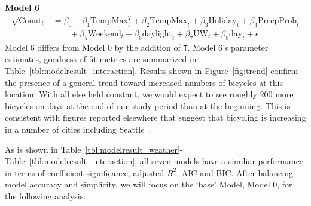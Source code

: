 \documentclass [11pt, proquest] {uwthesis}[2015/03/03]
\begin{document}
\textbf{Model 6}
\begin{align}
\sqrt{\text{Count}_t} &= \beta_0 + \beta_1 \text{TempMax}^2_t + \beta_2 \text{TempMax}_t + \beta_3 \text{Holiday}_t + \beta_4 \text{PrecpProb}_t \nonumber\\
&\qquad +\beta_5 \text{Weekend}_t  + \beta_6 \text{daylight}_t + \beta_7 \text{UW}_t + \beta_8\text{day}_t + \epsilon. \label{eqref:model6}
\end{align}
Model 6 differs from Model 0 by the addition of \texttt{T}. Model 6's parameter estimates, goodness-of-fit metrics are summarized in Table~\ref{tbl:modelresult_interaction}. Results shown in Figure~\ref{fig:trend} confirm the presence of a general trend toward increased numbers of bicycles at this location. With all else held constant, we would expect to see roughly 200 more bicycles on days at the end of our study period than at the beginning. This is consistent with figures
reported elsewhere that suggest that bicycling is increasing in a number of cities including Seattle~\cite{League-of-American-Bicyclists:aa}.


As is shown in Table~\ref{tbl:modelresult_weather}-Table~\ref{tbl:modelresult_interaction}, all seven models have a similiar performance in terms of coefficient significance, adjusted $R^2$, AIC and BIC. After balancing model accuracy and simplicity, we will focus on the `base' Model, Model 0, for the following analysis. 

%
%
\end{document}
